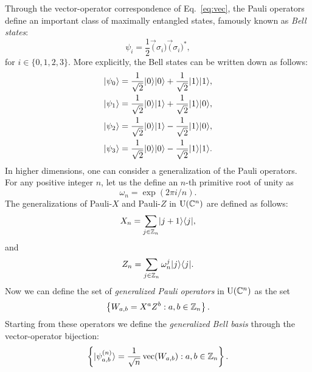 Through the vector-operator correspondence of Eq.~\ref{eq:vec}, 
the Pauli operators define an important class of maximally
entangled states, famously known as \emph{Bell states}:
\begin{equation}
  \psi_{i} = \frac{1}{2}\vec(\sigma_{i})\vec(\sigma_{i})^{\ast},
\end{equation}
for $i \in \{0,1,2,3\}$. More explicitly, the Bell states can be written down as follows:
\begin{equation} 
\label{eq:Bell-states}
  \begin{aligned}
    \ket{\psi_0} & = \frac{1}{\sqrt{2}}\ket{0}\ket{0} 
    + \frac{1}{\sqrt{2}}\ket{1}\ket{1},\\
    \ket{\psi_1} & = \frac{1}{\sqrt{2}}\ket{0}\ket{1} 
    + \frac{1}{\sqrt{2}}\ket{1}\ket{0},\\
    \ket{\psi_2} & = \frac{1}{\sqrt{2}}\ket{0}\ket{1} 
    - \frac{1}{\sqrt{2}}\ket{1}\ket{0},\\
    \ket{\psi_3} & = \frac{1}{\sqrt{2}}\ket{0}\ket{0} 
    - \frac{1}{\sqrt{2}}\ket{1}\ket{1}.
  \end{aligned}
\end{equation}
In higher dimensions, one can consider a generalization of the Pauli operators.
For any positive integer $n$, let us the define an $n$-th primitive root of unity as 
\begin{equation}
  \omega_{n} = \exp(2\pi i/n).
\end{equation}
The generalizations of Pauli-$X$ and Pauli-$Z$ in $\mathrm{U}(\mathbb{C}^{n})$ 
are defined as follows:
\begin{equation}
  X_{n} = \sum_{j \in \mathbb{Z}_{n}}\lvert\mspace{0.5mu} j+1 \mspace{0.5mu} \rangle\langle\mspace{0.5mu} j \mspace{0.5mu} \rvert,
\end{equation}
and
\begin{equation}
  Z_{n} = \sum_{j \in \mathbb{Z}_{n}}\omega_{n}^{j}\lvert\mspace{0.5mu} j \mspace{0.5mu} \rangle\langle\mspace{0.5mu} j \mspace{0.5mu} \rvert.
\end{equation}
Now we can define the set of \emph{generalized Pauli operators} in $\mathrm{U}(\mathbb{C}^{n})$ as the set
\begin{equation}
\label{eq:generalized-Pauli-operators}
  \left\{ W_{a,b} = X^{a}Z^{b} : a,b\in\integer_{n}\right\}.
\end{equation}
Starting from these operators we define the \emph{generalized Bell basis}
through the vector-operator bijection:
\begin{equation}
\label{eq:generalized-bell-basis}
  \left\{ \ket{\psi_{a,b}^{(n)}} = \frac{1}{\sqrt{n}}\vec(W_{a,b}) : a,b\in\integer_{n} \right\}.
\end{equation}

